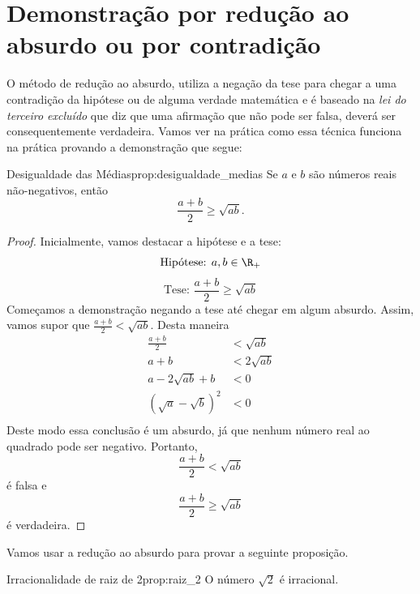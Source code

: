 \section{Demonstração por redução ao absurdo ou por contradição}

O método de redução ao absurdo, utiliza a negação da tese para chegar a uma
contradição da hipótese ou de alguma verdade matemática e é baseado na
\emph{lei do terceiro excluído} que diz que uma afirmação que não pode ser
falsa, deverá ser consequentemente verdadeira. Vamos ver na prática como essa
técnica funciona na prática provando a demonstração que segue:

\begin{proposicao}{Desigualdade das Médias}{prop:desigualdade_medias}
  Se $a$ e $b$ são números reais não-negativos, então
  \[
    \frac{a+b}{2} \geq \sqrt{ab}.
  \]
\end{proposicao}

\begin{proof}
  Inicialmente, vamos destacar a hipótese e a tese:
  \[
    \text{Hipótese: } a, b \in \R_{+}
  \]
  \[
    \text{Tese: } \frac{a+b}{2} \geq \sqrt{ab}
  \]
  Começamos a demonstração negando a tese até chegar em algum absurdo.
  Assim, vamos supor que \(\frac{a+b}{2} < \sqrt{ab}\).
  Desta maneira
  \begin{align*}
    \frac{a+b}{2} & < \sqrt{ab} \\
    a+b & < 2 \sqrt{ab} \\
    a-2\sqrt{ab}+b & <0 \\
    (\sqrt{a}-\sqrt{b})^2 & <0 \\
  \end{align*}
  Deste modo essa conclusão é um absurdo, já que nenhum número real ao quadrado
  pode ser negativo. Portanto,
  \[
    \frac{a+b}{2} < \sqrt{ab}
  \]
  é falsa e
  \[
    \frac{a+b}{2} \geq \sqrt{ab}
  \]
  é verdadeira.
\end{proof}

Vamos usar a redução ao absurdo para provar a seguinte proposição.

\begin{proposicao}{Irracionalidade de raiz de 2}{prop:raiz_2}
  O número $\sqrt{2}$ é irracional.
\end{proposicao}

